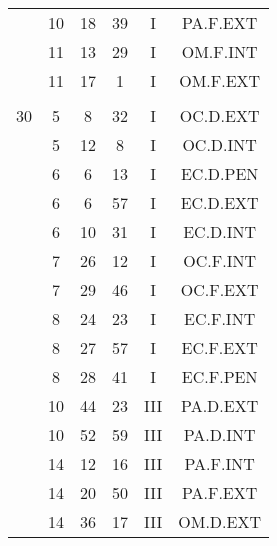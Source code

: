 \documentclass[12pt, a4paper]{article}
\begin{document}
\begin{multicols}{3}
{\begin{tabular}{c c c c c c}
	 	 	 	 & 10 & 18 & 39 & I & PA.F.EXT\\%
	 	 	 	 & 11 & 13 & 29 & I & OM.F.INT\\%
	 	 	 	 & 11 & 17 & 1 & I & OM.F.EXT\\%
	 	 	 	 & & & & & \\%
	 	 	 	30 & 5 & 8 & 32 & I & OC.D.EXT\\%
	 	 	 	 & 5 & 12 & 8 & I & OC.D.INT\\%
	 	 	 	 & 6 & 6 & 13 & I & EC.D.PEN\\%
	 	 	 	 & 6 & 6 & 57 & I & EC.D.EXT\\%
	 	 	 	 & 6 & 10 & 31 & I & EC.D.INT\\%
	 	 	 	 & 7 & 26 & 12 & I & OC.F.INT\\%
	 	 	 	 & 7 & 29 & 46 & I & OC.F.EXT\\%
	 	 	 	 & 8 & 24 & 23 & I & EC.F.INT\\%
	 	 	 	 & 8 & 27 & 57 & I & EC.F.EXT\\%
	 	 	 	 & 8 & 28 & 41 & I & EC.F.PEN\\%
	 	 	 	 & 10 & 44 & 23 & III & PA.D.EXT\\%
	 	 	 	 & 10 & 52 & 59 & III & PA.D.INT\\%
	 	 	 	 & 14 & 12 & 16 & III & PA.F.INT\\%
	 	 	 	 & 14 & 20 & 50 & III & PA.F.EXT\\%
	 	 	 	 & 14 & 36 & 17 & III & OM.D.EXT\\%
	 	 \end{tabular}
 	}
\end{multicols}
\end{document}
